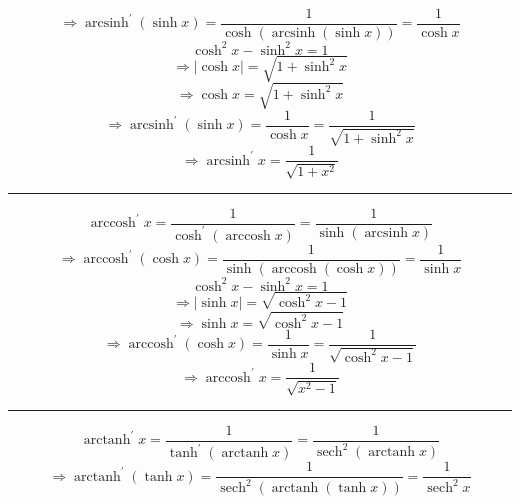 \documentclass[a0paper,landscape,fleqn]{article}
\DeclareMathOperator{\sech}{sech}
\DeclareMathOperator{\arcsinh}{arcsinh}
\DeclareMathOperator{\arccosh}{arccosh}
\DeclareMathOperator{\arctanh}{arctanh}
\begin{document}
\begin{equation*}
\Rightarrow\arcsinh^\prime (\sinh x)
=\frac{1}{\cosh(\arcsinh(\sinh x))}
=\frac{1}{\cosh x}
\end{equation*}
\begin{equation*}
\cosh^2 x-\sinh^2 x=1
\end{equation*}
\begin{equation*}
\Rightarrow|\cosh x|=\sqrt{1+\sinh^2 x}
\end{equation*}
\begin{equation*}
\Rightarrow\cosh x=\sqrt{1+\sinh^2 x}
\end{equation*}
\begin{equation*}
\Rightarrow\arcsinh^\prime (\sinh x)
=\frac{1}{\cosh x}
=\frac{1}{\sqrt{1+\sinh^2 x}}
\end{equation*}
\begin{equation*}
\Rightarrow\arcsinh^\prime x
=\frac{1}{\sqrt{1+x^2}}
\end{equation*}
\hrule
\begin{equation*}
\arccosh^\prime x
=\frac{1}{\cosh^\prime(\arccosh x)}
=\frac{1}{\sinh(\arcsinh x)}
\end{equation*}
\begin{equation*}
\Rightarrow\arccosh^\prime (\cosh x)
=\frac{1}{\sinh(\arccosh(\cosh x))}
=\frac{1}{\sinh x}
\end{equation*}
\begin{equation*}
\cosh^2 x-\sinh^2 x=1
\end{equation*}
\begin{equation*}
\Rightarrow|\sinh x|=\sqrt{\cosh^2 x-1}
\end{equation*}
\begin{equation*}
\Rightarrow\sinh x=\sqrt{\cosh^2 x-1}
\end{equation*}
\begin{equation*}
\Rightarrow\arccosh^\prime (\cosh x)
=\frac{1}{\sinh x}
=\frac{1}{\sqrt{\cosh^2 x-1}}
\end{equation*}
\begin{equation*}
\Rightarrow\arccosh^\prime x
=\frac{1}{\sqrt{x^2-1}}
\end{equation*}
\hrule
\begin{equation*}
\arctanh^\prime x
=\frac{1}{\tanh^\prime(\arctanh x)}
=\frac{1}{\sech^2(\arctanh x)}
\end{equation*}
\begin{equation*}
\Rightarrow\arctanh^\prime(\tanh x)
=\frac{1}{\sech^2(\arctanh(\tanh x))}
=\frac{1}{\sech^2 x}
\end{equation*}
\end{document}
